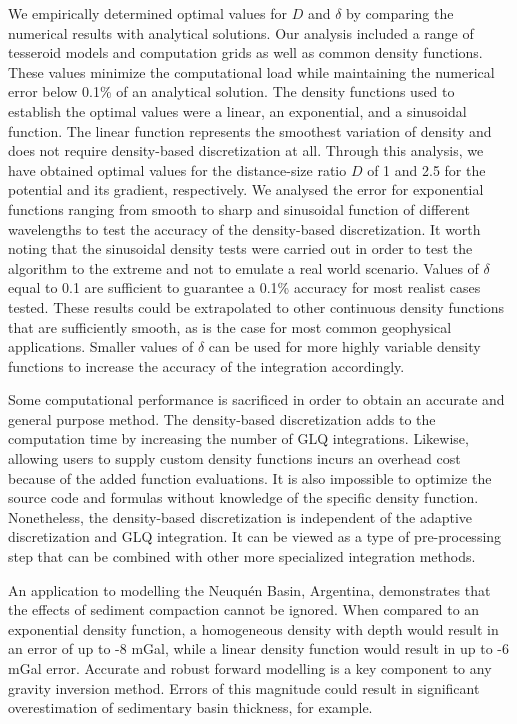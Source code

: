 \documentclass[extra, referee]{gji}
\begin{document}
We empirically determined optimal values for $D$ and $\delta$ by comparing the numerical
results with analytical solutions.
Our analysis included a range of tesseroid models and computation grids as well as
common density functions.
These values minimize the computational load while maintaining the numerical error below
0.1\% of an analytical solution.
The density functions used to establish the optimal values were a linear, an
exponential, and a sinusoidal function.
The linear function represents the smoothest variation of density and does not require
density-based discretization at all.
Through this analysis, we have obtained optimal values for the distance-size ratio $D$
of 1 and 2.5 for the potential and its gradient, respectively.
We analysed the error for exponential functions ranging from smooth to sharp and
sinusoidal function of different wavelengths to test the accuracy of the density-based
discretization.
It worth noting that the sinusoidal density tests were carried out in order to test the
algorithm to the extreme and not to emulate a real world scenario.
Values of $\delta$ equal to 0.1 are sufficient to guarantee a 0.1\% accuracy for most
realist cases tested.
These results could be extrapolated to other continuous density functions that are
sufficiently smooth, as is the case for most common geophysical applications.
Smaller values of $\delta$ can be used for more highly variable density functions to
increase the accuracy of the integration accordingly.

Some computational performance is sacrificed in order to obtain an accurate and general
purpose method.
The density-based discretization adds to the computation time by increasing
the number of GLQ integrations.
Likewise, allowing users to supply custom density functions incurs an overhead cost
because of the added function evaluations.
It is also impossible to optimize the source code and formulas without knowledge of the
specific density function.
Nonetheless, the density-based discretization is independent of the adaptive
discretization and GLQ integration.
It can be viewed as a type of pre-processing step that can be combined with other more
specialized integration methods.

An application to modelling the Neuqu\'en Basin, Argentina, demonstrates that the
effects of sediment compaction cannot be ignored.
When compared to an exponential density function, a homogeneous density with depth would
result in an error of up to -8 mGal, while a linear density function would result in up
to -6 mGal error.
Accurate and robust forward modelling is a key component to any gravity inversion
method.
Errors of this magnitude could result in significant overestimation of sedimentary
basin thickness, for example.
\end{document}
